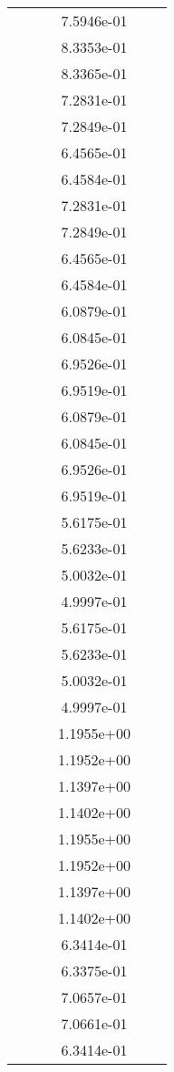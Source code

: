 \begin{xltabular}{\textwidth}{r|rS[table-format=1.3e+2]S[table-format=1.4e+2]S[table-format=1.4e+2]S[table-format=-1.5]}
&  &  & 7.5946e-01 & & \\
&  &  & 8.3353e-01 & & \\
&  &  & 8.3365e-01 & & \\
&  &  & 7.2831e-01 & & \\
&  &  & 7.2849e-01 & & \\
&  &  & 6.4565e-01 & & \\
&  &  & 6.4584e-01 & & \\
&  &  & 7.2831e-01 & & \\
&  &  & 7.2849e-01 & & \\
&  &  & 6.4565e-01 & & \\
&  &  & 6.4584e-01 & & \\
&  &  & 6.0879e-01 & & \\
&  &  & 6.0845e-01 & & \\
&  &  & 6.9526e-01 & & \\
&  &  & 6.9519e-01 & & \\
&  &  & 6.0879e-01 & & \\
&  &  & 6.0845e-01 & & \\
&  &  & 6.9526e-01 & & \\
&  &  & 6.9519e-01 & & \\
&  &  & 5.6175e-01 & & \\
&  &  & 5.6233e-01 & & \\
&  &  & 5.0032e-01 & & \\
&  &  & 4.9997e-01 & & \\
&  &  & 5.6175e-01 & & \\
&  &  & 5.6233e-01 & & \\
&  &  & 5.0032e-01 & & \\
&  &  & 4.9997e-01 & & \\
&  &  & 1.1955e+00 & & \\
&  &  & 1.1952e+00 & & \\
&  &  & 1.1397e+00 & & \\
&  &  & 1.1402e+00 & & \\
&  &  & 1.1955e+00 & & \\
&  &  & 1.1952e+00 & & \\
&  &  & 1.1397e+00 & & \\
&  &  & 1.1402e+00 & & \\
&  &  & 6.3414e-01 & & \\
&  &  & 6.3375e-01 & & \\
&  &  & 7.0657e-01 & & \\
&  &  & 7.0661e-01 & & \\
&  &  & 6.3414e-01 & & \\

\end{xltabular}
